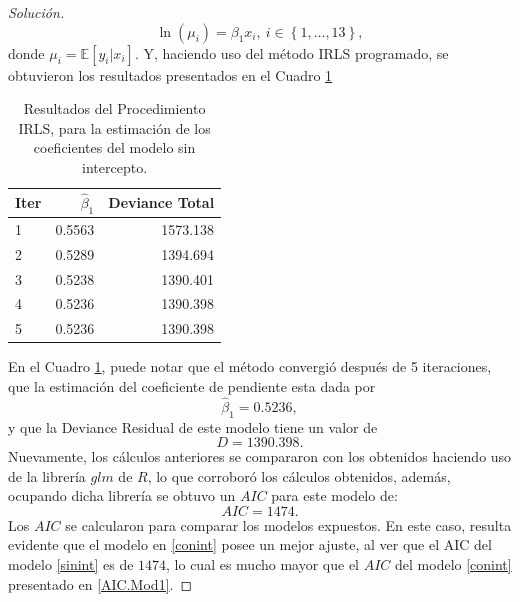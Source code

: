 \documentclass[10.5pt,notitlepage]{article}
\newenvironment{solucion}
  {\begin{proof}[Solución]}
  {\end{proof}}
\newcommand{\EE}{\mathbb{E}}
\newcommand{\kis}[1]{\left\{ #1 \right\}}
\theoremstyle{plain}
\begin{document}
\begin{solucion}
\begin{equation}
  \ln(\mu_i) = \beta_1 x_i, \ i\in \kis{1, \hdots, 13},  
\end{equation}
donde \(\mu_i = \EE[y_i | x_i]\). Y, haciendo uso del método IRLS programado, se obtuvieron los resultados presentados en el Cuadro \ref{tab:ref2} 
\begin{table}[H]
        \centering
        \begin{tabular}{@{}l@{\hskip 0.3in}r@{\hskip 0.3in}r@{}}
            \toprule
            Iter & \(\hat{\beta}_1\)& Deviance Total \\
            \midrule
                   1&  0.5563& 1573.138\\ 
                    2&0.5289& 1394.694 \\
                    3&0.5238& 1390.401 \\
                    4& 0.5236& 1390.398 \\
                    5& 0.5236& 1390.398\\
            \bottomrule
        \end{tabular}
        \caption{Resultados del Procedimiento IRLS, para la estimación de los coeficientes del modelo sin intercepto.}
        \label{tab:ref2}
\end{table}
En el Cuadro \ref{tab:ref2}, puede notar que el método convergió después de 5 iteraciones, que la estimación del coeficiente de pendiente esta dada por 
\[
 \hat{\beta}_1 = 0.5236, 
\] 
y que la Deviance Residual de este modelo tiene un valor de 
\[
D =  1390.398.
\]
Nuevamente, los cálculos anteriores se compararon con los obtenidos haciendo uso de la librería \(glm\) de \(R\), lo que corroboró los cálculos obtenidos, además, ocupando dicha librería se obtuvo un \(AIC\) para este modelo de: 
\begin{equation*}
AIC  =  1474.     
\end{equation*}
Los \(AIC\) se calcularon para comparar los modelos expuestos. En este caso, resulta evidente que el modelo en \eqref{conint} posee un mejor ajuste, al ver que el AIC del modelo \eqref{sinint} es de \( 1474\), lo cual es mucho mayor que el \(AIC\) del modelo \eqref{conint} presentado en \eqref{AIC.Mod1}. 
\end{solucion}
\end{document}

